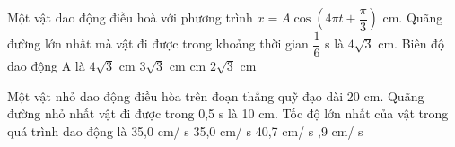 \setcounter{ex}{0}
\setcounter{paragraph}{0}
\PhanI
\begin{ex}%
Một vật dao động điều hoà với phương trình $x = A\cos(4\pi t +\dfrac{\pi}{3})$ cm. Quãng đường lớn nhất mà vật đi được trong khoảng thời gian  $\dfrac{1}{6}$ s là $4\sqrt{3}$ cm. Biên độ dao động A là
\choice
{$4\sqrt{3}$ cm}
{$3\sqrt{3}$ cm}
{ cm}
{$2\sqrt{3}$ cm}
\end{ex} 

\begin{ex}%
Một vật nhỏ dao động điều hòa trên đoạn thẳng quỹ đạo dài 20 cm. Quãng đường nhỏ nhất vật đi được trong 0,5 s là 10 cm. Tốc độ lớn nhất của vật trong quá trình dao động là
\choice
{35,0 cm/ s}
{35,0 cm/ s}
{40,7 cm/ s}
{,9 cm/ s}
\end{ex} 



